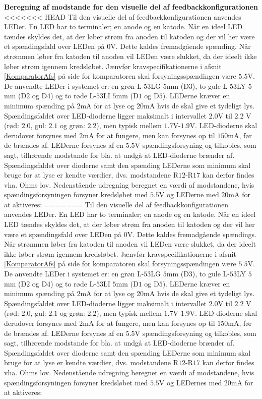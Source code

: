 \noindent\textbf{Beregning af modstande for den visuelle del af feedbackkonfigurationen} \\
<<<<<<< HEAD
Til den visuelle del af feedbackkonfigurationen anvendes LEDer. En LED har to terminaler; en anode og en katode. Når en ideel LED tændes skyldes det, at der løber strøm fra anoden til katoden og der vil her være et spændingsfald over LEDen på 0V. Dette kaldes fremadgående spænding. Når strømmen løber fra katoden til anoden vil LEDen være slukket, da der ideelt ikke løber strøm igennem kredsløbet.\cite{Sedra2010} Jænvfør kravspecifikationerne i afsnit \ref{KomparatorAfs} på side \pageref{KomparatorAfs} for komparatoren skal forsyningsspændingen være $5.5$V. De anvendte LEDer i systemet er: en grøn L-$53$LG $5$mm (D$3$), to gule L-$53$LY $5$mm (D$2$ og D$4$) og to røde L-$53$LI $5$mm (D$1$ og D$5$). LEDerne kræver en minimum spænding på $2$mA for at lyse og $20$mA hvis de skal give et tydeligt lys.  Spændingsfaldet over LED-dioderne ligger maksimalt i intervallet $2.0$V til $2.2$ V (rød: $2.0$, gul: $2.1$ og grøn: $2.2$), men typisk mellem $1.7$V-$1.9$V. LED-dioderne skal derudover forsynes med $2$mA for at fungere, men kan forsynes op til $150$mA, før de brændes af. LEDerne forsynes af en $5.5$V spændingsforsyning og tilkobles, som sagt, tilhørende modstande for bla. at undgå at LED-dioderne brænder af. \cite{kingbright} Spændingsfaldet over dioderne samt den spænding LEDerne som minimum skal bruge for at lyse er kendte værdier, dvs. modstandene R$12$-R$17$ kan derfor findes vha. Ohms lov. Nedenstående udregning beregnet en værdi af modstandene, hvis spændingsforsyningen forsyner kredsløbet med $5.5$V og LEDerne med $20$mA for at aktiveres:
=======
Til den visuelle del af feedbackkonfigurationen anvendes LEDer. En LED har to terminaler; en anode og en katode. Når en ideel LED tændes skyldes det, at der løber strøm fra anoden til katoden og der vil her være et spændingsfald over LEDen på 0V. Dette kaldes fremadgående spændings. Når strømmen løber fra katoden til anoden vil LEDen være slukket, da der ideelt ikke løber strøm igennem kredsløbet. 
Jænvfør kravspecifikationerne i afsnit \ref{KomparatorAfs} på side \pageref{KomparatorAfs} for komparatoren skal forsyningsspændingen være $5.5$V. De anvendte LEDer i systemet er: en grøn L-$53$LG $5$mm (D$3$), to gule L-$53$LY $5$mm (D$2$ og D$4$) og to røde L-$53$LI $5$mm (D$1$ og D$5$). LEDerne kræver en minimum spænding på $2$mA for at lyse og $20$mA hvis de skal give et tydeligt lys.  Spændingsfaldet over LED-dioderne ligger maksimalt i intervallet $2.0$V til $2.2$ V (rød: $2.0$, gul: $2.1$ og grøn: $2.2$), men typisk mellem $1.7$V-$1.9$V. LED-dioderne skal derudover forsynes med $2$mA for at fungere, men kan forsynes op til $150$mA, før de brændes af. LEDerne forsynes af en $5.5$V spændingsforsyning og tilkobles, som sagt, tilhørende modstande for bla. at undgå at LED-dioderne brænder af. \cite{kingbright} Spændingsfaldet over dioderne samt den spænding LEDerne som minimum skal bruge for at lyse er kendte værdier, dvs. modstandene R$12$-R$17$ kan derfor findes vha. Ohms lov. Nedenstående udregning beregnet en værdi af modstandene, hvis spændingsforsyningen forsyner kredsløbet med $5.5$V og LEDernes med $20$mA for at aktiveres:
